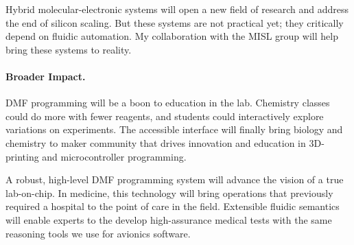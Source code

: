 \documentclass[12pt]{article}
\begin{document}
Hybrid molecular-electronic systems will open a new field of research and address the end of silicon scaling.
But these systems are not practical yet; they critically depend on fluidic automation.
My collaboration with the MISL group will help bring these systems to reality.

\paragraph{Broader Impact.}
DMF programming will be a boon to education in the lab.
Chemistry classes could do more with fewer reagents, and students could interactively explore variations on experiments.
The accessible interface will finally bring biology and chemistry to maker community that drives innovation and education in 3D-printing and microcontroller programming.

A robust, high-level DMF programming system will advance the vision of a true lab-on-chip.
In medicine, this technology will bring operations that previously required a hospital to the point of care in the field.
Extensible fluidic semantics will enable experts to the develop high-assurance medical tests with the same reasoning tools we use for avionics software.















\end{document}
